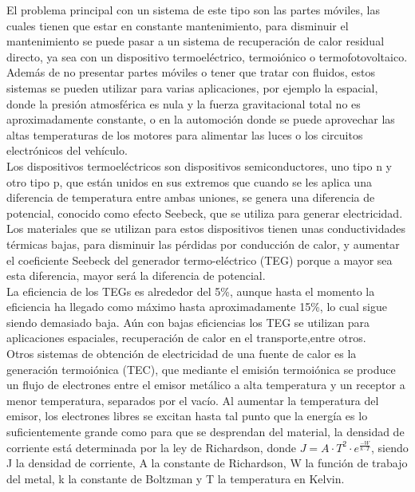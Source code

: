 El problema principal con un sistema de este tipo son las partes móviles, las cuales tienen que estar en constante mantenimiento, para disminuir el mantenimiento se puede pasar a un sistema de recuperación de calor residual directo, ya sea con un dispositivo termoeléctrico, termoiónico o termofotovoltaico. Además de no presentar partes móviles o tener que tratar con fluidos, estos sistemas se pueden utilizar para varias aplicaciones, por ejemplo la espacial, donde la presión atmosférica es nula y la fuerza gravitacional total no es aproximadamente constante, o en la automoción donde se puede aprovechar las altas temperaturas de los motores para alimentar las luces o los circuitos electrónicos del vehículo.\\

Los dispositivos termoeléctricos son dispositivos semiconductores, uno tipo n y otro tipo p, que están unidos en sus extremos que cuando se les aplica una diferencia de temperatura entre ambas uniones, se genera una diferencia de potencial, conocido como efecto Seebeck, que se utiliza para generar electricidad. Los materiales que se utilizan para estos dispositivos tienen unas conductividades térmicas bajas, para disminuir las pérdidas por conducción de calor, y aumentar el coeficiente Seebeck del generador termo-eléctrico (TEG) porque a mayor sea esta diferencia, mayor será la diferencia de potencial.\\

La eficiencia de los TEGs es alrededor del 5\%, aunque hasta el momento la eficiencia ha llegado como máximo hasta aproximadamente 15\%, lo cual sigue siendo demasiado baja. Aún con bajas eficiencias los TEG se utilizan para aplicaciones espaciales, recuperación de calor en el transporte,entre otros.\\


Otros sistemas de obtención de electricidad de una fuente de calor es la generación termoiónica (TEC), que mediante el emisión termoiónica se produce un flujo de electrones entre el emisor metálico a alta temperatura y un receptor a menor temperatura, separados por el vacío. Al aumentar la temperatura del emisor, los electrones libres se excitan hasta tal punto que la energía es lo suficientemente grande como para que se desprendan del material, la densidad de corriente está determinada por la ley de Richardson, donde $J=A\cdot T^2\cdot e^{\frac{-W}{k\cdot T}}$, siendo J la densidad de corriente, A la constante de Richardson, W la función de trabajo del metal, k la constante de Boltzman y T la temperatura en Kelvin.\\

